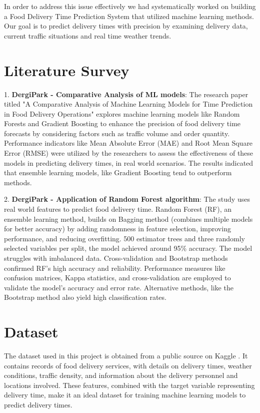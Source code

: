 \documentclass[10pt,twocolumn,letterpaper]{article}
\begin{document}
In order to address this issue effectively we had systematically worked on building a Food Delivery Time Prediction System that utilized machine learning methods. Our goal is to predict delivery times with precision by examining delivery data, current traffic situations and real time weather trends.

\section{Literature Survey}
1. \textbf{DergiPark - Comparative Analysis of ML models}: The research paper titled "A Comparative Analysis of Machine Learning Models for Time Prediction in Food Delivery Operations" explores machine learning models like Random Forests and Gradient Boosting to enhance the precision of food delivery time forecasts by considering factors such as traffic volume and order quantity. Performance indicators like Mean Absolute Error (MAE) and Root Mean Square Error (RMSE) were utilized by the researchers to assess the effectiveness of these models in predicting delivery times, in real world scenarios. The results indicated that ensemble learning models, like Gradient Boosting tend to outperform methods. \cite{dergipark1}

2. \textbf{DergiPark - Application of Random Forest algorithm}: The study uses real world features to predict food delivery time. Random Forest (RF), an ensemble learning method, builds on Bagging method (combines multiple models for better accuracy) by adding randomness in feature selection, improving performance, and reducing overfitting. 500 estimator trees and three randomly selected variables per split, the model achieved around 95\% accuracy. The model struggles with imbalanced data. Cross-validation and Bootstrap methods confirmed RF's high accuracy and reliability. Performance measures like confusion matrices, Kappa statistics, and cross-validation are employed to validate the model’s accuracy and error rate. Alternative methods, like the Bootstrap method also yield high classification rates. \cite{dergipark2}

\section{Dataset}
    The dataset used in this project is obtained from a public source on Kaggle \cite{kaggle}. It contains records of food delivery services, with details on delivery times, weather conditions, traffic density, and information about the delivery personnel and locations involved. These features, combined with the target variable representing delivery time, make it an ideal dataset for training machine learning models to predict delivery times.
\end{document}
